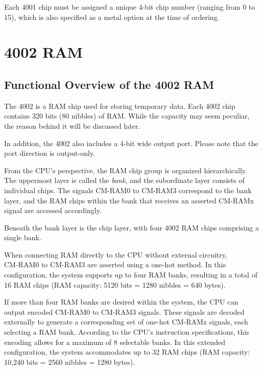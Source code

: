Each 4001 chip must be assigned a unique 4-bit chip number (ranging from 0 to 15), which is also specified as a metal option at the time of ordering.

\section{4002 RAM}
\subsection{Functional Overview of the 4002 RAM}
The 4002 is a RAM chip used for storing temporary data. Each 4002 chip contains 320 bits (80 nibbles) of RAM. While the capacity may seem peculiar, the reason behind it will be discussed later.

In addition, the 4002 also includes a 4-bit wide output port. Please note that the port direction is output-only.

From the CPU's perspective, the RAM chip group is organized hierarchically. The uppermost layer is called the \textit{bank}, and the subordinate layer consists of individual chips. The signals $\overline{\text{CM-RAM0}}$ to $\overline{\text{CM-RAM3}}$ correspond to the bank layer, and the RAM chips within the bank that receives an asserted $\overline{\text{CM-RAMx}}$ signal are accessed accordingly.

Beneath the bank layer is the chip layer, with four 4002 RAM chips comprising a single bank.

When connecting RAM directly to the CPU without external circuitry, $\overline{\text{CM-RAM0}}$ to $\overline{\text{CM-RAM3}}$ are asserted using a one-hot method. In this configuration, the system supports up to four RAM banks, resulting in a total of 16 RAM chips (RAM capacity: 5120 bits = 1280 nibbles = 640 bytes).

If more than four RAM banks are desired within the system, the CPU can output encoded $\overline{\text{CM-RAM0}}$ to $\overline{\text{CM-RAM3}}$ signals. These signals are decoded externally to generate a corresponding set of one-hot $\overline{\text{CM-RAMx}}$ signals, each selecting a RAM bank. According to the CPU's instruction specifications, this encoding allows for a maximum of 8 selectable banks. In this extended configuration, the system accommodates up to 32 RAM chips (RAM capacity: 10,240 bits = 2560 nibbles = 1280 bytes).


